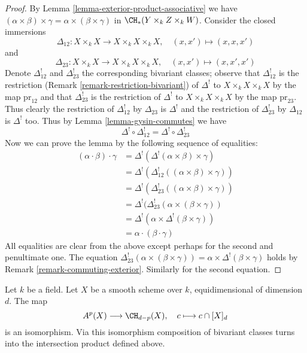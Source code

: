 \begin{proof}
By Lemma \ref{lemma-exterior-product-associative} we have
$(\alpha \times \beta) \times \gamma =
\alpha \times (\beta \times \gamma)$ in $\CH_*(Y \times_k Z \times_k W)$.
Consider the closed immersions
$$
\Delta_{12} : X \times_k X \longrightarrow X \times_k X \times_k X,
\quad (x, x') \mapsto (x, x, x')
$$
and
$$
\Delta_{23} : X \times_k X \longrightarrow X \times_k X \times_k X,
\quad (x, x') \mapsto (x, x', x')
$$
Denote $\Delta_{12}^!$ and $\Delta_{23}^!$ the corresponding bivariant
classes; observe that $\Delta_{12}^!$ is the restriction
(Remark \ref{remark-restriction-bivariant}) of $\Delta^!$
to $X \times_k X \times_k X$ by the map $\text{pr}_{12}$ and that
$\Delta_{23}^!$ is the restriction of $\Delta^!$
to $X \times_k X \times_k X$ by the map $\text{pr}_{23}$.
Thus clearly the restriction of $\Delta_{12}^!$ by $\Delta_{23}$
is $\Delta^!$ and the restriction of $\Delta_{23}^!$ by $\Delta_{12}$ is
$\Delta^!$ too. Thus by Lemma \ref{lemma-gysin-commutes} we have
$$
\Delta^! \circ \Delta_{12}^! =
\Delta^! \circ \Delta_{23}^! 
$$
Now we can prove the lemma by the following sequence of equalities:
\begin{align*}
(\alpha \cdot \beta) \cdot \gamma
& =
\Delta^!(\Delta^!(\alpha \times \beta) \times \gamma) \\
& =
\Delta^!(\Delta_{12}^!((\alpha \times \beta) \times \gamma)) \\
& =
\Delta^!(\Delta_{23}^!((\alpha \times \beta) \times \gamma)) \\
& =
\Delta^!(\Delta_{23}^!(\alpha \times (\beta \times \gamma)) \\
& =
\Delta^!(\alpha \times \Delta^!(\beta \times \gamma)) \\
& =
\alpha \cdot (\beta \cdot \gamma)
\end{align*}
All equalities are clear from the above except perhaps
for the second and penultimate one. The equation
$\Delta_{23}^!(\alpha \times (\beta \times \gamma)) =
\alpha \times \Delta^!(\beta \times \gamma)$ holds by
Remark \ref{remark-commuting-exterior}. Similarly for the second
equation.
\end{proof}

\begin{lemma}
\label{lemma-identify-chow-for-smooth}
Let $k$ be a field. Let $X$ be a smooth scheme over $k$, equidimensional
of dimension $d$. The map
$$
A^p(X) \longrightarrow \CH_{d - p}(X),\quad
c \longmapsto c \cap [X]_d
$$
is an isomorphism. Via this isomorphism composition of bivariant
classes turns into the intersection product defined above.
\end{lemma}

